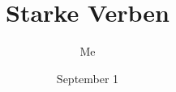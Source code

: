 \documentclass{article}
\title{Starke Verben}
\author{Me}
\date{September 1}
\begin{document}
\begin{titlepage}
\maketitle
\end{titlepage}
\end{document}
